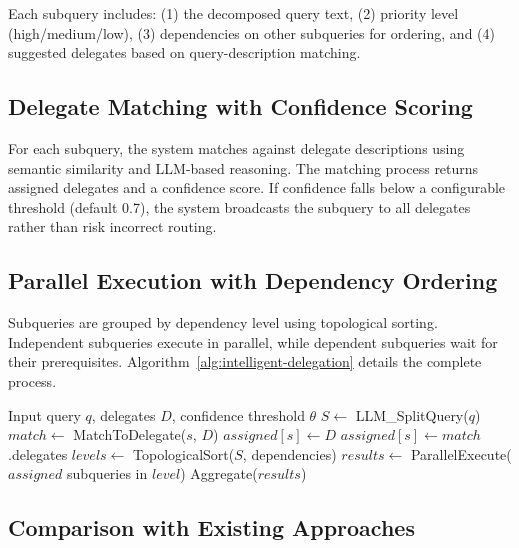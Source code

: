 \documentclass[11pt]{article}
\begin{document}
Each subquery includes: (1) the decomposed query text, (2) priority level (high/medium/low), (3) dependencies on other subqueries for ordering, and (4) suggested delegates based on query-description matching.

\subsection{Delegate Matching with Confidence Scoring}

For each subquery, the system matches against delegate descriptions using semantic similarity and LLM-based reasoning. The matching process returns assigned delegates and a confidence score. If confidence falls below a configurable threshold (default 0.7), the system broadcasts the subquery to all delegates rather than risk incorrect routing.

\subsection{Parallel Execution with Dependency Ordering}

Subqueries are grouped by dependency level using topological sorting. Independent subqueries execute in parallel, while dependent subqueries wait for their prerequisites. Algorithm~\ref{alg:intelligent-delegation} details the complete process.

\begin{algorithm}[t]
\caption{Intelligent Delegation}
\label{alg:intelligent-delegation}
\begin{algorithmic}[1]
\REQUIRE Input query $q$, delegates $D$, confidence threshold $\theta$
\STATE $S \leftarrow$ LLM\_SplitQuery($q$) 
    \STATE $match \leftarrow$ MatchToDelegate($s$, $D$)
        \STATE $assigned[s] \leftarrow D$ 
    \ELSE
        \STATE $assigned[s] \leftarrow match$.delegates
    \ENDIF
\ENDFOR
\STATE $levels \leftarrow$ TopologicalSort($S$, dependencies)
    \STATE $results \leftarrow$ ParallelExecute($assigned$ subqueries in $level$)
\ENDFOR
\RETURN Aggregate($results$)
\end{algorithmic}
\end{algorithm}

\subsection{Comparison with Existing Approaches}
\end{document}
